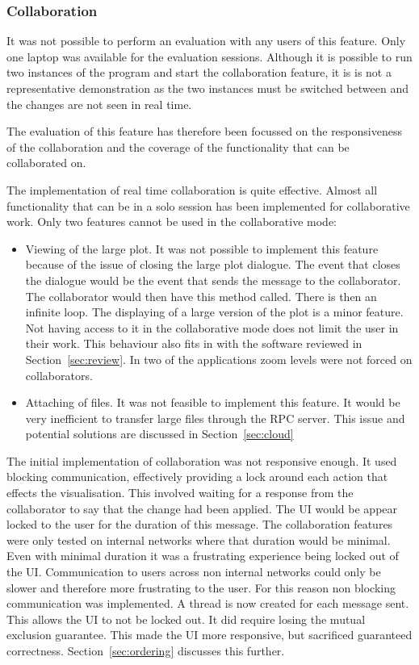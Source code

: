 \subsubsection{Collaboration}

It was not possible to perform an evaluation with any users of this feature.  Only one laptop was available for the evaluation sessions.  Although it is possible to run two instances of the program and start the collaboration feature, it is is not a representative demonstration as the two instances must be switched between and the changes are not seen in real time.

The evaluation of this feature has therefore been focussed on the responsiveness of the collaboration and the coverage of the functionality that can be collaborated on.

The implementation of real time collaboration is quite effective.  Almost all functionality that can be in a solo session has been implemented for collaborative work.  Only two features cannot be used in the collaborative mode:
\begin{itemize}
\item Viewing of the large plot. It was not possible to implement this feature because of the issue of closing the large plot dialogue.  The event that closes the dialogue would be the event that sends the message to the collaborator.  The collaborator would then have this method called.  There is then an infinite loop.  The displaying of a large version of the plot is a minor feature.  Not having access to it in the collaborative mode does not limit the user in their work.  This behaviour also fits in with the software reviewed in Section~\ref{sec:review}.  In two of the applications zoom levels were not forced on collaborators.
\item Attaching of files.  It was not feasible to implement this feature.  It would be very inefficient to transfer large files through the RPC server.  This issue and potential solutions are discussed in Section~\ref{sec:cloud}
\end{itemize}

The initial implementation of collaboration was not responsive enough.  It used blocking communication, effectively providing a lock around each action that effects the visualisation.  This involved waiting for a response from the collaborator to say that the change had been applied.  The \ac{UI} would be appear locked to the user for the duration of this message.  The collaboration features were only tested on internal networks where that duration would be minimal.  Even with minimal duration it was a frustrating experience being locked out of the \ac{UI}.  Communication to users across non internal networks could only be slower and therefore more frustrating to the user.  For this reason non blocking communication was implemented.  A thread is now created for each message sent.  This allows the \ac{UI} to not be locked out.  It did require losing the mutual exclusion guarantee.  This made the \ac{UI} more responsive, but sacrificed guaranteed correctness. Section~\ref{sec:ordering} discusses this further.

